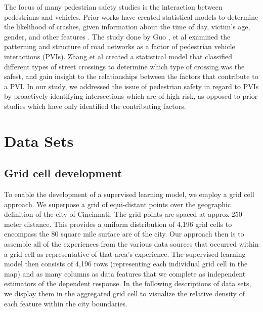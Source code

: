 \documentclass{llncs}
\begin{document}
The focus of many pedestrian safety studies is the interaction between pedestrians and vehicles. Prior works have created statistical models to determine the likelihood of crashes, given information about the time of day, victim's age, gender, and other features \cite{brude1993models} \cite{lascala2000demographic} \cite{lyon2002pedestrian} \cite{ladron2004forecasting} \cite{pulugurtha2011pedestrian} \cite{ukkusuri2011random}. The study done by Guo \cite{guo2017effect}, et al examined the patterning and structure of road networks as a factor of pedestrian vehicle interactions (PVIs). Zhang et al \cite{zhang2017quantitative} created a statistical model that classified different types of street crossings to determine which type of crossing was the safest, and gain insight to the relationships between the factors that contribute to a PVI. In our study, we addressed the issue of pedestrian safety in regard to PVIs by proactively identifying intersections which are of high risk, as opposed to prior studies which have only identified the contributing factors.

\section{Data Sets}


\subsection{Grid cell development}

To enable the development of a supervised learning model, we employ a grid cell approach. We superpose a grid of equi-distant points over the geographic definition of the city of Cincinnati. The grid points are spaced at approx 250 meter distance. This provides a uniform distribution of 4,196 grid cells to encompass the 80 square mile surface are of the city. Our approach then is to assemble all of the experiences from the various data sources that occurred within a grid cell as representative of that area's experience. The supervised learning model then consists of 4,196 rows (representing each individual grid cell in the map) and as many columns as data features that we complete as independent estimators of the dependent response. In the following descriptions of data sets, we display them in the aggregated grid cell to visualize the relative density of each feature within the city boundaries. 
\end{document}
